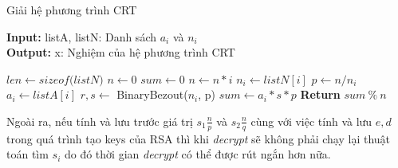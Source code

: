 \begin{algorithm}[H]
\caption{Giải hệ phương trình CRT}\label{alg:solve-crt}
\hspace*{\algorithmicindent} \textbf{Input:} listA, listN: Danh sách $a_i$ và $n_i$\\
\hspace*{\algorithmicindent} \textbf{Output:} x: Nghiệm của hệ phương trình CRT
\begin{algorithmic}[1]
\State $len \gets \textit{sizeof(listN)}$
\State $n \gets 0$
\State $sum \gets 0$
\State $n \gets n*i$
\EndFor
{}
\State $n_i \gets listN[i]$
\State $p \gets n/n_i$
\State $a_i \gets listA[i]$
\State $r,s \gets$ BinaryBezout($n_i$, p)
\State $sum \gets a_i*s*p$
\EndFor
\State \textbf{Return } $sum\ \%\ n$
\EndProcedure
\end{algorithmic}
\end{algorithm}

Ngoài ra, nếu tính và lưu trước giá trị $s_1\frac{n}{p}$ và $s_2\frac{n}{q}$ cùng với việc tính và lưu $e, d$ trong quá trình tạo keys của RSA thì khi \textit{decrypt} sẽ không phải 
chạy lại thuật toán tìm $s_i$ do đó thời gian \textit{decrypt} có thể được rút ngắn hơn nữa.